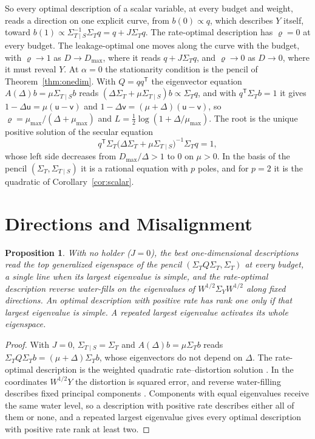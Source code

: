 \documentclass[11pt,onecolumn]{IEEEtran}
\newtheorem{proposition}[theorem]{Proposition}
\newcommand{\Kc}{\Sigma_{T\mid S}}
\begin{document}
So every optimal description of a scalar variable, at every budget and
weight, reads a direction on one explicit curve, from $b(0)\propto q$,
which describes $Y$ itself, toward
$b(1)\propto\Kc^{-1}\Sigma_Tq=q+J\Sigma_Tq$. The rate-optimal description
has $\varrho=0$ at every budget. The leakage-optimal one moves along the
curve with the budget, with $\varrho\to1$ as $D\to D_{\max}$, where it reads
$q+J\Sigma_Tq$, and $\varrho\to0$ as $D\to0$, where it must reveal $Y$.
At $\alpha=0$ the stationarity condition is the pencil of
Theorem~\ref{thm:onedim}. With $Q=qq^{\mathsf T}$ the eigenvector equation
$A(\Delta)b=\mu\Kc b$ reads $(\Delta\Sigma_T+\mu\Kc)b\propto\Sigma_Tq$, and
with $q^{\mathsf T}\Sigma_Tb=1$ it gives $1-\Delta\mathsf u=\mu(\mathsf u-\mathsf v)$
and $1-\Delta\mathsf v=(\mu+\Delta)(\mathsf u-\mathsf v)$, so
$\varrho=\mu_{\max}/(\Delta+\mu_{\max})$ and $L=\tfrac12\log(1+\Delta/\mu_{\max})$.
The root is the unique positive solution of the secular equation
\begin{equation}
q^{\mathsf T}\Sigma_T\bigl(\Delta\Sigma_T+\mu\Kc\bigr)^{-1}\Sigma_Tq=1 ,
\label{eq:secular}
\end{equation}
whose left side decreases from $D_{\max}/\Delta>1$ to $0$ on $\mu>0$. In
the basis of the pencil $(\Sigma_T,\Kc)$ it is a rational equation with
$p$ poles, and for $p=2$ it is the quadratic of
Corollary~\ref{cor:scalar}.


\section{Directions and Misalignment}
\label{sec:directions}

\begin{proposition}\label{prop:single}
With no holder ($J=0$), the best one-dimensional descriptions read the
top generalized eigenspace of the pencil $(\Sigma_TQ\Sigma_T,\Sigma_T)$ at
every budget, a single line when its largest eigenvalue is simple, and
the rate-optimal description reverse water-fills on the eigenvalues of
$W^{1/2}\Sigma_YW^{1/2}$ along fixed directions. An optimal description
with positive rate has rank one only if that largest eigenvalue is
simple. A repeated largest eigenvalue activates its whole eigenspace.
\end{proposition}

\begin{proof}
With $J=0$, $\Kc=\Sigma_T$ and $A(\Delta)b=\mu\Sigma_Tb$ reads
$\Sigma_TQ\Sigma_Tb=(\mu+\Delta)\Sigma_Tb$, whose eigenvectors do not
depend on $\Delta$. The rate-optimal description is the weighted
quadratic rate--distortion solution \cite{sakrison1968}. In the
coordinates $W^{1/2}Y$ the distortion is squared error, and reverse
water-filling describes fixed principal components \cite{berger1971}.
Components with equal eigenvalues receive the same water level, so a
description with positive rate describes either all of them or none, and
a repeated largest eigenvalue gives every optimal description with
positive rate rank at least two.
\end{proof}
\end{document}
